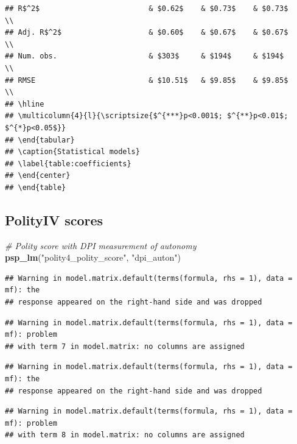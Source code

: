 \documentclass[
]{article}
\newenvironment{Shaded}{\begin{snugshade}}{\end{snugshade}}
\newcommand{\CommentTok}[1]{\textcolor[rgb]{0.56,0.35,0.01}{\textit{#1}}}
\newcommand{\KeywordTok}[1]{\textcolor[rgb]{0.13,0.29,0.53}{\textbf{#1}}}
\newcommand{\NormalTok}[1]{#1}
\newcommand{\StringTok}[1]{\textcolor[rgb]{0.31,0.60,0.02}{#1}}
\begin{document}
\begin{verbatim}
## R$^2$                         & $0.62$    & $0.73$    & $0.73$      \\
## Adj. R$^2$                    & $0.60$    & $0.67$    & $0.67$      \\
## Num. obs.                     & $303$     & $194$     & $194$       \\
## RMSE                          & $10.51$   & $9.85$    & $9.85$      \\
## \hline
## \multicolumn{4}{l}{\scriptsize{$^{***}p<0.001$; $^{**}p<0.01$; $^{*}p<0.05$}}
## \end{tabular}
## \caption{Statistical models}
## \label{table:coefficients}
## \end{center}
## \end{table}
\end{verbatim}

\hypertarget{polityiv-scores-1}{%
\subsection{PolityIV scores}\label{polityiv-scores-1}}

\begin{Shaded}
\begin{Highlighting}[]
\CommentTok{# Polity score with DPI measurement of autonomy }
\KeywordTok{psp_lm}\NormalTok{(}\StringTok{"polity4_polity_score"}\NormalTok{, }\StringTok{"dpi_auton"}\NormalTok{)}
\end{Highlighting}
\end{Shaded}

\begin{verbatim}
## Warning in model.matrix.default(terms(formula, rhs = 1), data = mf): the
## response appeared on the right-hand side and was dropped
\end{verbatim}

\begin{verbatim}
## Warning in model.matrix.default(terms(formula, rhs = 1), data = mf): problem
## with term 7 in model.matrix: no columns are assigned
\end{verbatim}

\begin{verbatim}
## Warning in model.matrix.default(terms(formula, rhs = 1), data = mf): the
## response appeared on the right-hand side and was dropped
\end{verbatim}

\begin{verbatim}
## Warning in model.matrix.default(terms(formula, rhs = 1), data = mf): problem
## with term 8 in model.matrix: no columns are assigned
\end{verbatim}
\end{document}
